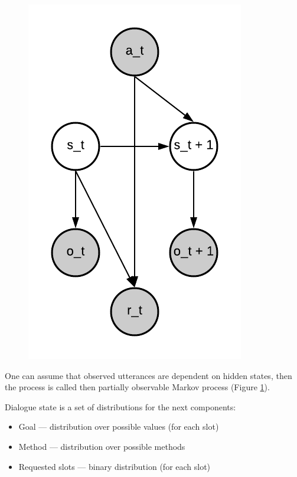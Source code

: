 \documentclass[12pt,titlepage,a4paper]{article}
\begin{document}
\begin{figure}[!htb]
      \includegraphics[width=\linewidth]{partial-markov.png}
      \caption{}
      \label{PartialMarkov}
    \endminipage
\end{figure}

One can assume that observed utteran\-ces are dependent on hidden states, then the process is called then partially observable Markov process (Figure \ref{PartialMarkov}).

Dialogue state is a set of distributions for the next components: 
\begin{itemize}
    \item Goal --- distribution over possible values (for each slot)
    \item Method --- distribution over possible methods
    \item Requested slots --- binary distribution (for each slot)
\end{itemize}
\end{document}
